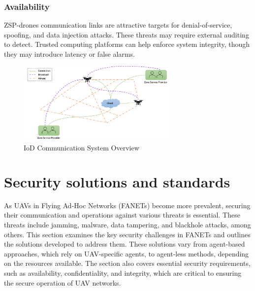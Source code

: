 \subsubsection{Availability}
ZSP-drones communication links are attractive targets for denial-of-service, spoofing, and data injection attacks. These threats may require external auditing to detect. Trusted computing platforms can help enforce system integrity, though they may introduce latency or false alarms.

    \begin{figure}[H]
        \centering
        \includegraphics[width=0.7\textwidth]{Figures/Chapter2/Section2/3.png}
        \caption{ IoD Communication System Overview ~\cite{tsao2022survey}}
        \label{fig:IOD_system}
    \end{figure}

\section{Security solutions and standards}

As UAVs in Flying Ad-Hoc Networks (FANETs) become more prevalent, securing their communication and operations against various threats is essential. These threats include jamming, malware, data tampering, and blackhole attacks, among others. This section examines the key security challenges in FANETs and outlines the solutions developed to address them. These solutions vary from agent-based approaches, which rely on UAV-specific agents, to agent-less methods, depending on the resources available. The section also covers essential security requirements, such as availability, confidentiality, and integrity, which are critical to ensuring the secure operation of UAV networks.

